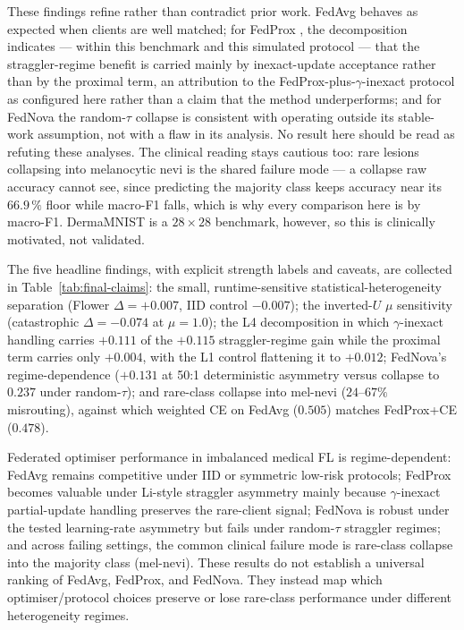 \documentclass[11pt,a4paper]{report}
\begin{document}
These findings refine rather than contradict prior work. FedAvg
\citep{mcmahan2017fedavg} behaves as expected when clients are well matched; for
FedProx \citep{li2020fedprox}, the decomposition indicates --- within this
benchmark and this simulated protocol --- that the straggler-regime benefit is
carried mainly by inexact-update acceptance rather than by the proximal term, an
attribution to the FedProx-plus-$\gamma$-inexact protocol as configured here
rather than a claim that the method underperforms; and for FedNova
\citep{wang2020fednova} the random-$\tau$ collapse is consistent with operating
outside its stable-work assumption, not with a flaw in its analysis. No result
here should be read as refuting these analyses. The clinical reading stays
cautious too: rare lesions collapsing into melanocytic nevi is the shared failure
mode --- a collapse raw accuracy cannot see, since predicting the majority class
keeps accuracy near its $66.9\,\%$ floor while macro-F1 falls, which is why every
comparison here is by macro-F1. DermaMNIST is a $28 \times 28$ benchmark, however,
so this is clinically motivated, not validated.

The five headline findings, with explicit strength labels and caveats, are
collected in Table~\ref{tab:final-claims}: the small, runtime-sensitive
statistical-heterogeneity separation (Flower $\Delta = +0.007$, IID control
$-0.007$); the inverted-$U$ $\mu$ sensitivity (catastrophic $\Delta = -0.074$ at
$\mu = 1.0$); the L4 decomposition in which $\gamma$-inexact handling carries
$+0.111$ of the $+0.115$ straggler-regime gain while the proximal term carries
only $+0.004$, with the L1 control flattening it to $+0.012$; FedNova's
regime-dependence ($+0.131$ at 50:1 deterministic asymmetry versus collapse to
$0.237$ under random-$\tau$); and rare-class collapse into mel-nevi ($24$--$67\%$
misrouting), against which weighted CE on FedAvg ($0.505$) matches FedProx+CE
($0.478$).

Federated optimiser performance in imbalanced medical FL is regime-dependent:
FedAvg remains competitive under IID or symmetric low-risk protocols;
FedProx becomes valuable under Li-style straggler asymmetry mainly because
$\gamma$-inexact partial-update handling preserves the rare-client signal;
FedNova is robust under the tested learning-rate asymmetry but fails under
random-$\tau$ straggler regimes; and across failing settings, the common
clinical failure mode is rare-class collapse into the majority class
(mel-nevi). These results do not establish a universal ranking of FedAvg,
FedProx, and FedNova. They instead map which optimiser/protocol choices
preserve or lose rare-class performance under different heterogeneity
regimes.
\end{document}
